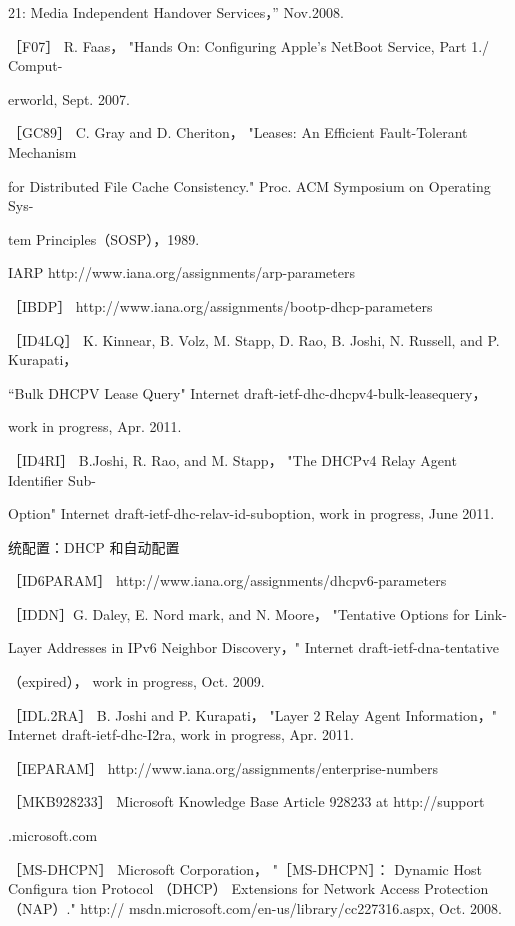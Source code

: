 21: Media Independent Handover Services，” Nov.2008.

［F07］ R. Faas， "Hands On: Configuring Apple's NetBoot Service, Part 1./ Comput-

erworld, Sept. 2007.

［GC89］ C. Gray and D. Cheriton， "Leases: An Efficient Fault-Tolerant Mechanism

for Distributed File Cache Consistency." Proc. ACM Symposium on Operating Sys-

tem Principles（SOSP），1989.

IARP http://www.iana.org/assignments/arp-parameters

［IBDP］ http://www.iana.org/assignments/bootp-dhcp-parameters

［ID4LQ］ K. Kinnear, B. Volz, M. Stapp, D. Rao, B. Joshi, N. Russell,
and P. Kurapati，

“Bulk DHCPV Lease Query" Internet draft-ietf-dhc-dhcpv4-bulk-leasequery，

work in progress, Apr. 2011.

［ID4RI］ B.Joshi, R. Rao, and M. Stapp， "The DHCPv4 Relay Agent Identifier Sub-

Option" Internet draft-ietf-dhc-relav-id-suboption, work in progress, June 2011.

统配置：DHCP 和自动配置

［ID6PARAM］ http://www.iana.org/assignments/dhcpv6-parameters

［IDDN］G. Daley, E. Nord mark, and N. Moore， "Tentative Options for Link-

Layer Addresses in IPv6 Neighbor Discovery，" Internet draft-ietf-dna-tentative

（expired）， work in progress, Oct. 2009.

［IDL.2RA］ B. Joshi and P. Kurapati， "Layer 2 Relay Agent Information，" Internet
draft-ietf-dhc-I2ra, work in progress, Apr. 2011.

［IEPARAM］ http://www.iana.org/assignments/enterprise-numbers

［MKB928233］ Microsoft Knowledge Base Article 928233 at http://support

.microsoft.com

［MS-DHCPN］ Microsoft Corporation， "［MS-DHCPN］： Dynamic Host Configura
tion Protocol （DHCP） Extensions for Network Access Protection （NAP）." http://
msdn.microsoft.com/en-us/library/cc227316.aspx, Oct. 2008.
